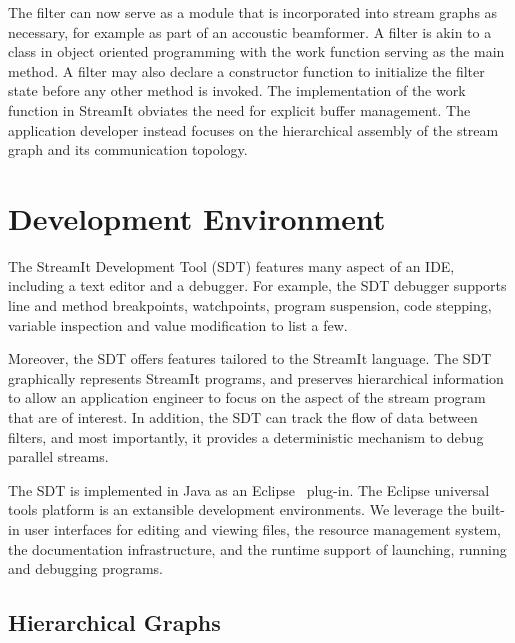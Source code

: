 \documentclass[11pt, letterpaper, onecolumn]{article}
\begin{document}
The filter can now serve as  a module that is incorporated into stream
graphs as necessary, for example as part of an accoustic beamformer. A
filter is akin to a class in object oriented programming with the work
function  serving as  the main  method. A  filter may  also  declare a
constructor function  to initialize the filter state  before any other
method is invoked. The implementation of the work function in StreamIt
obviates  the need  for  explicit buffer  management. The  application
developer instead focuses on the  hierarchical assembly of  the stream
graph and its communication topology.


\section{Development Environment}

The StreamIt  Development Tool (SDT)  features many aspect of  an IDE,
including a text editor and  a debugger. For example, the SDT debugger
supports line and method breakpoints, watchpoints, program suspension,
code stepping,  variable inspection and  value modification to  list a
few.

Moreover,   the  SDT   offers  features   tailored  to   the  StreamIt
language.  The  SDT  graphically  represents  StreamIt  programs,  and
preserves hierarchical information to allow an application engineer to
focus on  the aspect of  the stream program  that are of  interest. In
addition, the SDT can track the flow of data between filters, and most
importantly, it  provides a deterministic mechanism  to debug parallel
streams.

The SDT  is implemented in Java as  an Eclipse~\cite{eclispe} plug-in.
The  Eclipse universal  tools  platform is  an extansible  development
environments. We leverage the built-in user interfaces for editing and
viewing  files,  the  resource  management system,  the  documentation
infrastructure,  and the  runtime  support of  launching, running  and
debugging programs.



\subsection{Hierarchical Graphs}
\end{document}
